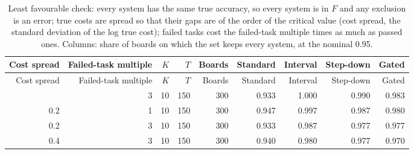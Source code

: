\begin{longtable}{rrrrrrrrr}
\caption{Least favourable check: every system has the same true accuracy, so every system is in $F$ and any exclusion is an error; true costs are spread so that their gaps are of the order of the critical value (cost spread, the standard deviation of the log true cost); failed tasks cost the failed-task multiple times as much as passed ones. Columns: share of boards on which the set keeps every system, at the nominal 0.95.}\label{tab:supp-stress}\\
\toprule
Cost spread & Failed-task multiple & $K$ & $T$ & Boards & Standard & Interval & Step-down & Gated \\
\midrule
\endfirsthead
\toprule
Cost spread & Failed-task multiple & $K$ & $T$ & Boards & Standard & Interval & Step-down & Gated \\
\midrule
\endhead
\bottomrule
\endfoot
0.1 & 3 & 10 & 150 & 300 & 0.933 & 1.000 & 0.990 & 0.983 \\
0.2 & 1 & 10 & 150 & 300 & 0.947 & 0.997 & 0.987 & 0.980 \\
0.2 & 3 & 10 & 150 & 300 & 0.933 & 0.987 & 0.977 & 0.977 \\
0.4 & 3 & 10 & 150 & 300 & 0.940 & 0.980 & 0.977 & 0.970 \\
\end{longtable}
